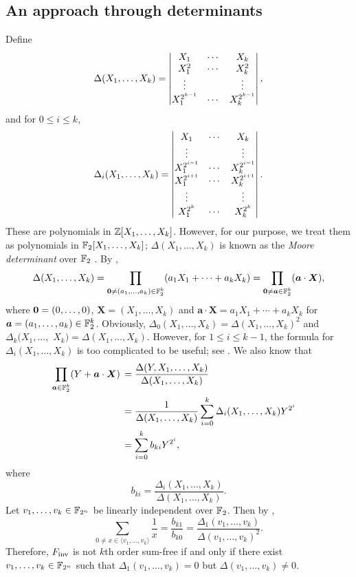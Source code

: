 \documentclass{amsart}
\numberwithin{equation}{section}
\theoremstyle{definition}
\newcommand{\f}{\Bbb F}
\newcommand{\fin}{F_{\text{\rm inv}}}
\newcommand{\ba}{\boldsymbol a}
\newcommand{\x}{\boldsymbol X}
\begin{document}
\subsection{An approach through determinants}
Define
\begin{equation}\label{1.3}
\Delta(X_1,\dots,X_k)=\left|
\begin{matrix}
X_1&\cdots&X_k\cr
X_1^2&\cdots&X_k^2\cr
\vdots&&\vdots\cr
X_1^{2^{k-1}}&\cdots&X_k^{2^{k-1}}
\end{matrix}\right|,
\end{equation}
and for $0\le i\le k$,
\begin{equation}\label{1.4}
\Delta_i(X_1,\dots,X_k)=\left|
\begin{matrix}
X_1&\cdots&X_k\cr
\vdots&&\vdots\cr
X_1^{2^{i-1}}&\cdots&X_k^{2^{i-1}}\cr
X_1^{2^{i+1}}&\cdots&X_k^{2^{i+1}}\cr
\vdots&&\vdots\cr
X_1^{2^{k}}&\cdots&X_k^{2^{k}}
\end{matrix}\right|.
\end{equation}
These are polynomials in $\Bbb Z[X_1,\dots,X_k]$. However, for our purpose, we treat them as polynomials in $\f_2[X_1,\dots,X_k]$; $\Delta(X_1,\dots,X_k)$ is known as the {\em Moore determinant} over $\f_2$ \cite{Moore-BAMS-1896}.
By \cite[Lemma~3.51]{Lidl-Niederreiter-FF-1997}, 
\begin{equation}\label{1.5}
\Delta(X_1,\dots,X_k)=\prod_{{\bf 0}\ne(a_1,\dots,a_k)\in\f_2^k}(a_1X_1+\cdots+a_kX_k)=\prod_{{\bf 0}\ne\ba\in\f_2^k}(\ba\cdot\x),
\end{equation}
where ${\bf 0}=(0,\dots ,0)$, $\x=(X_1,\dots,X_k)$ and $\ba\cdot\x=a_1X_1+\cdots+a_kX_k$ for $\ba=(a_1,\dots,a_k)\in\f_2^k$. Obviously, $\Delta_0(X_1,\dots,X_k)=\Delta(X_1,\dots,X_k)^2$ and $\Delta_k(X_1,\dots,$ $X_k)=\Delta(X_1,\dots,X_k)$. However, for $1\le i\le k-1$, the formula for $\Delta_i(X_1,\dots,X_k)$ is too complicated to be useful; see \cite[Appendix]{Hou-Sze-LMA02022}. We also know that \cite[Exercise~2.15]{Hou-ams-gsm-2018}
\begin{align*}
\prod_{\ba\in\f_2^k}(Y+\ba\cdot\x)\,&=\frac{\Delta(Y,X_1,\dots,X_k)}{\Delta(X_1,\dots,X_k)}\cr
&=\frac 1{\Delta(X_1,\dots,X_k)}\sum_{i=0}^k\Delta_i(X_1,\dots,X_k)Y^{2^i}\cr
&=\sum_{i=0}^kb_{ki}Y^{2^i},
\end{align*}
where 
\[
b_{ki}=\frac{\Delta_i(X_1,\dots,X_k)}{\Delta(X_1,\dots,X_k)}.
\]
Let $v_1,\dots,v_k\in\f_{2^n}$ be linearly independent over $\f_2$. Then by \cite{Carlet-0,Carlet-pre},
\begin{equation}\label{1.6}
\sum_{0\ne x\in\langle v_1,\dots,v_k\rangle}\frac 1x=\frac{b_{k1}}{b_{k0}}=\frac{\Delta_1(v_1,\dots,v_k)}{\Delta(v_1,\dots,v_k)^2}.
\end{equation}
Therefore, $\fin$ is not $k$th order sum-free if and only if there exist $v_1,\dots,v_k\in\f_{2^n}$ such that $\Delta_1(v_1,\dots,v_k)=0$ but $\Delta(v_1,\dots,v_k)\ne 0$.
\end{document}
